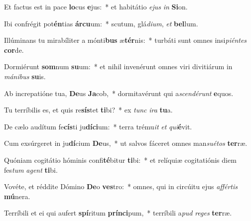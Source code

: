 \item Et factus est in pace \textbf{lo}cus \textbf{e}jus:~* et habitátio \textit{e}\textit{jus} \textit{in} \textbf{Si}on.
\item Ibi confrégit pot\textbf{én}tias \textbf{ár}\textbf{cu}um:~* scutum, glá\textit{di}\textit{um}, \textit{et} \textbf{bel}lum.
\item Illúminans tu mirabíliter a mónti\textbf{bus} æ\textbf{tér}nis:~* turbáti sunt omnes insi\textit{pi}\textit{én}\textit{tes} \textbf{cor}de.
\item Dormiérunt \textbf{som}num \textbf{su}um:~* et nihil invenérunt omnes viri divitiárum in \textit{má}\textit{ni}\textit{bus} \textbf{su}is.
\item Ab increpatióne tua, \textbf{De}us \textbf{Ja}cob,~* dormitavérunt qui a\textit{scen}\textit{dé}\textit{runt} \textbf{e}quos.
\item Tu terríbilis es, et quis re\textbf{sís}tet \textbf{ti}bi?~* ex \textit{tunc} \textit{i}\textit{ra} \textbf{tu}a.
\item De cælo audítum fe\textbf{cís}ti ju\textbf{dí}\textbf{ci}um:~* terra trému\textit{it} \textit{et} \textit{qui}\textbf{é}vit.
\item Cum exsúrgeret in ju\textbf{dí}cium \textbf{De}us,~* ut salvos fáceret omnes man\textit{su}\textit{é}\textit{tos} \textbf{ter}ræ.
\item Quóniam cogitátio hóminis confi\textbf{té}bitur \textbf{ti}bi:~* et relíquiæ cogitatiónis diem fes\textit{tum} \textit{a}\textit{gent} \textbf{ti}bi.
\item Vovéte, et réddite Dómino \textbf{De}o \textbf{ves}tro:~* omnes, qui in circúitu ejus \textit{af}\textit{fér}\textit{tis} \textbf{mú}nera.
\item Terríbili et ei qui aufert \textbf{spí}ritum \textbf{prín}\textbf{ci}pum,~* terríbili a\textit{pud} \textit{re}\textit{ges} \textbf{ter}ræ.
